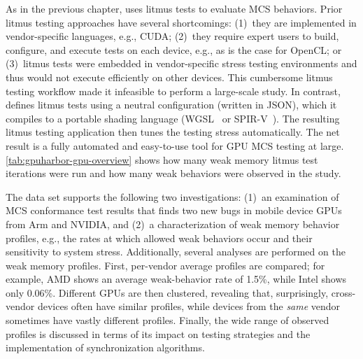 As in the previous chapter, \gpuharbor uses litmus tests to evaluate MCS behaviors. Prior litmus testing approaches have several shortcomings: (1)~they are implemented in vendor-specific languages, e.g., CUDA; (2)~they require expert users to build, configure, and execute tests on each device, e.g., as is the case for OpenCL; or (3)~litmus tests were embedded in vendor-specific stress testing environments and thus would not execute efficiently on other devices. This cumbersome litmus testing workflow made it infeasible to perform a large-scale study. In contrast, \gpuharbor defines litmus tests using a neutral configuration (written in JSON), which it compiles to a portable shading language (WGSL~\cite{webgpu-sl} or SPIR-V~\cite{spir-v}). The resulting litmus testing application then tunes the testing stress automatically. The net result is a fully automated and easy-to-use tool for GPU MCS testing at large. \mytablong\ref{tab:gpuharbor-gpu-overview} shows how many weak memory litmus test iterations were run and how many weak behaviors were observed in the study.

The data set supports the following two investigations: (1)~an examination of MCS conformance test results that finds two new bugs in mobile device GPUs from Arm and NVIDIA, and (2)~a characterization of weak memory behavior profiles, e.g., the rates at which allowed weak behaviors occur and their sensitivity to system stress. Additionally, several analyses are performed on the weak memory profiles. First, per-vendor average profiles are compared; for example, AMD shows an average weak-behavior rate of 1.5\%, while Intel shows only 0.06\%. Different GPUs are then clustered, revealing that, surprisingly, cross-vendor devices often have similar profiles, while devices from the \textit{same} vendor sometimes have vastly different profiles. Finally, the wide range of observed profiles is discussed in terms of its impact on testing strategies and the implementation of synchronization algorithms.

